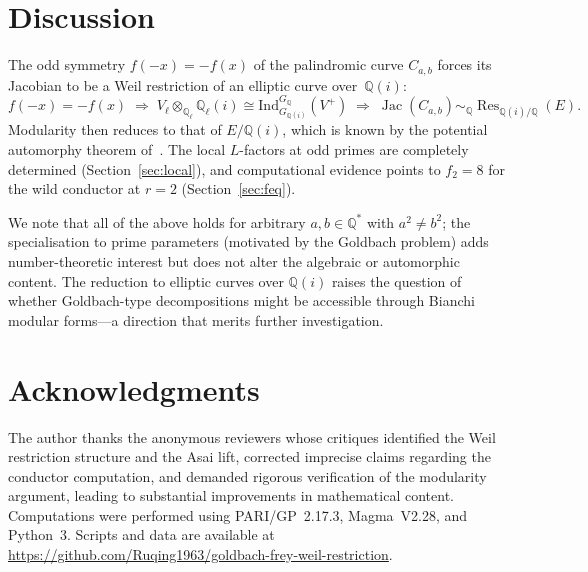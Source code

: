 \documentclass[11pt,a4paper]{article}
\newcommand{\Jac}{\operatorname{Jac}}
\newcommand{\Res}{\operatorname{Res}}
\newcommand{\Ql}{\mathbb{Q}_\ell}
\theoremstyle{definition}
\theoremstyle{remark}
\begin{document}
\section{Discussion}\label{sec:discussion}

The odd symmetry $f(-x) = -f(x)$ of the palindromic curve
$C_{a,b}$ forces its Jacobian to be a Weil restriction of an
elliptic curve over~$\mathbb{Q}(i)$:
\[
  f(-x) = -f(x)
  \;\Longrightarrow\;
  V_\ell \otimes_{\Ql} \Ql(i) \cong
  \mathrm{Ind}_{G_{\mathbb{Q}(i)}}^{G_{\mathbb{Q}}}(V^+)
  \;\Longrightarrow\;
  \Jac(C_{a,b}) \sim_{\mathbb{Q}}
  \Res_{\mathbb{Q}(i)/\mathbb{Q}}(E).
\]
Modularity then reduces to that of $E/\mathbb{Q}(i)$, which is
known by the potential automorphy theorem of~\cite{Allen}.
The local $L$-factors at odd primes are completely determined
(Section~\ref{sec:local}), and computational evidence points to
$f_2 = 8$ for the wild conductor at $r = 2$ (Section~\ref{sec:feq}).

We note that all of the above holds for arbitrary
$a, b \in \mathbb{Q}^*$ with $a^2 \ne b^2$; the
specialisation to prime parameters (motivated by the
Goldbach problem) adds number-theoretic interest but does
not alter the algebraic or automorphic content.
The reduction to elliptic curves over $\mathbb{Q}(i)$
raises the question of whether Goldbach-type decompositions
might be accessible through Bianchi modular forms---a
direction that merits further investigation.


\section*{Acknowledgments}

The author thanks the anonymous reviewers whose critiques
identified the Weil restriction structure and the Asai lift,
corrected imprecise claims regarding the conductor computation,
and demanded rigorous verification of the modularity argument,
leading to substantial improvements in mathematical content.
Computations were performed using PARI/GP~2.17.3,
Magma~V2.28, and Python~3.
Scripts and data are available at
\url{https://github.com/Ruqing1963/goldbach-frey-weil-restriction}.
\end{document}
